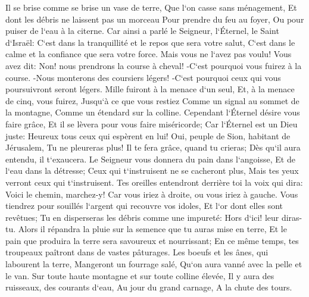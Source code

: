 \verse Il se brise comme se brise un vase de terre, Que l`on casse sans ménagement, Et dont les débris ne laissent pas un morceau Pour prendre du feu au foyer, Ou pour puiser de l`eau à la citerne. 
\verse Car ainsi a parlé le Seigneur, l`Éternel, le Saint d`Israël: C`est dans la tranquillité et le repos que sera votre salut, C`est dans le calme et la confiance que sera votre force. Mais vous ne l`avez pas voulu! 
\verse Vous avez dit: Non! nous prendrons la course à cheval! -C`est pourquoi vous fuirez à la course. -Nous monterons des coursiers légers! -C`est pourquoi ceux qui vous poursuivront seront légers. 
\verse Mille fuiront à la menace d`un seul, Et, à la menace de cinq, vous fuirez, Jusqu`à ce que vous restiez Comme un signal au sommet de la montagne, Comme un étendard sur la colline. 
\verse Cependant l`Éternel désire vous faire grâce, Et il se lèvera pour vous faire miséricorde; Car l`Éternel est un Dieu juste: Heureux tous ceux qui espèrent en lui! 
\verse Oui, peuple de Sion, habitant de Jérusalem, Tu ne pleureras plus! Il te fera grâce, quand tu crieras; Dès qu`il aura entendu, il t`exaucera. 
\verse Le Seigneur vous donnera du pain dans l`angoisse, Et de l`eau dans la détresse; Ceux qui t`instruisent ne se cacheront plus, Mais tes yeux verront ceux qui t`instruisent. 
\verse Tes oreilles entendront derrière toi la voix qui dira: Voici le chemin, marchez-y! Car vous iriez à droite, ou vous iriez à gauche. 
\verse Vous tiendrez pour souillés l`argent qui recouvre vos idoles, Et l`or dont elles sont revêtues; Tu en disperseras les débris comme une impureté: Hors d`ici! leur diras-tu. 
\verse Alors il répandra la pluie sur la semence que tu auras mise en terre, Et le pain que produira la terre sera savoureux et nourrissant; En ce même temps, tes troupeaux paîtront dans de vastes pâturages. 
\verse Les boeufs et les ânes, qui labourent la terre, Mangeront un fourrage salé, Qu`on aura vanné avec la pelle et le van. 
\verse Sur toute haute montagne et sur toute colline élevée, Il y aura des ruisseaux, des courants d`eau, Au jour du grand carnage, A la chute des tours. 

